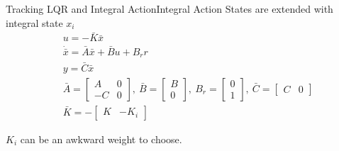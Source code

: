 \documentclass[10pt]{beamer}
\begin{document}
\begin{frame}{Tracking LQR and Integral Action}{Integral Action}
	States are extended with integral state $x_i$
	\begin{align}\label{eq:ClassicalIntegralAction}
		&u = -\bar{K}\bar{x} \\
		&\dot{\bar{x}} = \bar{A}\bar{x} + \bar{B}u + B_r r \\ 
		&y = \bar{C}\bar{x}\\
		&\bar{A} = \begin{bmatrix}A & 0 \\ -C & 0 \end{bmatrix}, \ \bar{B} = \begin{bmatrix} B \\ 0 \end{bmatrix}, \ B_r = \begin{bmatrix} 0 \\ 1 \end{bmatrix}, \ \bar{C} = \begin{bmatrix} C & 0 \end{bmatrix}\\
		& \bar{K} = -\begin{bmatrix} K & -K_i \end{bmatrix}
	\end{align}

	$K_i$ can be an awkward weight to choose.
\end{frame}

\end{document}
